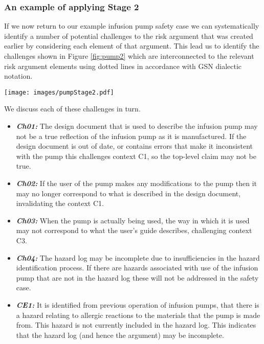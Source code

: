 \subsubsection{An example of applying Stage 2}

If we now return to our example infusion pump safety case we can systematically identify a number of potential challenges to the risk argument that was created earlier by considering each element of that argument. This lead us to identify the challenges shown in Figure \ref{fig:pump2} which are interconnected to the relevant risk argument elements using dotted lines in accordance with GSN dialectic notation. 

\begin{figure*}
\texttt{[image: images/pumpStage2.pdf]}
\caption{Adding potential challenges to the infusion pump risk argument.}
\label{fig:pump2}
\end{figure*}

We discuss each of these challenges in turn.

\begin{itemize}
    \item \textbf{\textit{Ch01:}} The design document that is used to describe the infusion pump may not be a true reflection of the infusion pump as it is manufactured. If the design document is out of date, or contains errors that make it inconsistent with the pump this challenges context C1, so the top-level claim may not be true.
    \item \textbf{\textit{Ch02:}} If the user of the pump makes any modifications to the pump then it may no longer correspond to what is described in the design document, invalidating the context C1.
    \item \textbf{\textit{Ch03:}} When the pump is actually being used, the way in which it is used may not correspond to what the user's guide describes, challenging context C3.
    \item \textbf{\textit{Ch04:}} The hazard log may be incomplete due to insufficiencies in the hazard identification process. If there are hazards associated with use of the infusion pump that are not in the hazard log these will not be addressed in the safety case.
    \item \textbf{\textit{CE1:}} It is identified from previous operation of infusion pumps, that there is a hazard relating to allergic reactions to the materials that the pump is made from. This hazard is not currently included in the hazard log. This indicates that the hazard log (and hence the argument) may be incomplete. 
\end{itemize}

